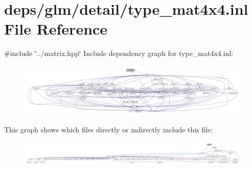 \hypertarget{type__mat4x4_8inl}{}\section{deps/glm/detail/type\+\_\+mat4x4.inl File Reference}
\label{type__mat4x4_8inl}
{\ttfamily \#include \char`\"{}../matrix.\+hpp\char`\"{}}\newline
Include dependency graph for type\+\_\+mat4x4.\+inl\+:
\nopagebreak
\begin{figure}[H]
\begin{center}
\leavevmode
\includegraphics[width=350pt]{d9/d22/type__mat4x4_8inl__incl}
\end{center}
\end{figure}
This graph shows which files directly or indirectly include this file\+:
\nopagebreak
\begin{figure}[H]
\begin{center}
\leavevmode
\includegraphics[width=350pt]{d5/da2/type__mat4x4_8inl__dep__incl}
\end{center}
\end{figure}
